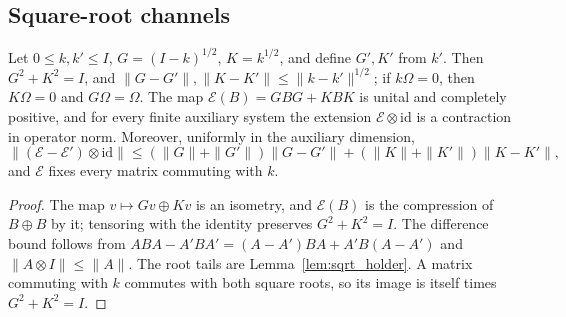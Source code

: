 \subsection{Square-root channels}
\label{sec:root_channels}

\begin{theorem}
    \label{thm:root_channel}
    \leanok
    Let $0\le k,k'\le I$, $G=(I-k)^{1/2}$, $K=k^{1/2}$, and define $G',K'$
    from $k'$. Then $G^2+K^2=I$, and
    $\|G-G'\|,\|K-K'\|\le\|k-k'\|^{1/2}$; if $k\Omega=0$, then $K\Omega=0$
    and $G\Omega=\Omega$. The map $\mathcal E(B)=GBG+KBK$ is unital and
    completely positive, and for every finite auxiliary system the extension
    $\mathcal E\otimes\mathrm{id}$ is a contraction in operator norm.
    Moreover, uniformly in the auxiliary dimension,
    \[
        \|(\mathcal E-\mathcal E')\otimes\mathrm{id}\|
        \le(\|G\|+\|G'\|)\|G-G'\|+(\|K\|+\|K'\|)\|K-K'\|,
    \]
    and $\mathcal E$ fixes every matrix commuting with $k$.
\end{theorem}
\begin{proof}\leanok
    The map $v\mapsto Gv\oplus Kv$ is an isometry, and $\mathcal E(B)$ is the
    compression of $B\oplus B$ by it; tensoring with the identity preserves
    $G^2+K^2=I$. The difference bound follows from
    $ABA-A'BA'=(A-A')BA+A'B(A-A')$ and $\|A\otimes I\|\le\|A\|$. The root
    tails are Lemma~\ref{lem:sqrt_holder}. A matrix commuting with $k$
    commutes with both square roots, so its image is itself times
    $G^2+K^2=I$.
\end{proof}


